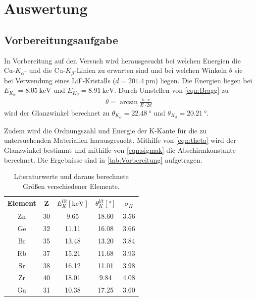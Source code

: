 \section{Auswertung}
\label{sec:Auswertung}

\subsection{Vorbereitungsaufgabe} %
\label{sub:Vorbereitung}

In Vorbereitung auf den Versuch wird herausgesucht bei welchen Energien die Cu-$K_\alpha$- und die Cu-$K_\beta$-Linien
zu erwarten sind und bei welchen Winkeln $\theta$ sie bei Verwendung eines LiF-Kristalls ($d = \qty{201.4}{\pico\meter}$) liegen.
Die Energien liegen bei $E_{K_\alpha}= \qty{8.05}{\kilo\electronvolt}$ und $E_{K_\beta}= \qty{8.91}{\kilo\electronvolt}$\cite{X-Ray}.
Durch Umstellen von \autoref{eqn:Bragg} zu
\begin{align}
  \theta = \arcsin{\frac{h \cdot c} {E \cdot 2 d}} \label{eqn:theta}
\end{align}
wird der Glanzwinkel berechnet zu $\theta_{K_\alpha}= \qty{22.48}{\degree}$ und $\theta_{K_\beta}= \qty{20.21}{\degree}$.

Zudem wird die Ordnungszahl und Energie der K-Kante für die zu untersuchenden Materialien harausgesucht. Mithilfe von
\autoref{eqn:theta} wird der Glanzwinkel bestimmt und mithilfe von \autoref{eqn:sigmak} die Abschirmkonstante berechnet.
Die Ergebnisse sind in \autoref{tab:Vorbereitung} aufgetragen.

\begin{table}[H]
  \centering
  \caption{Literaturwerte und daraus berechnete Größen verschiedener Elemente.\cite{X-Ray}}
  \label{tab:Vorbereitung}
  \begin{tabular}{c S[table-format=2.0] S S S[table-format=1.2] }
  \toprule
  {Element} & {Z} & {$E_{K}^{lit} [\si{\kilo\electronvolt}]$}& {$\theta_{K}^{lit} [\si{\degree}]$} & {$\sigma_K$}\\
  \midrule
    Zn & 30 &  9.65 & 18.60 & 3.56 \\
    Ge & 32 & 11.11 & 16.08 & 3.66 \\
    Br & 35 & 13.48 & 13.20 & 3.84 \\
    Rb & 37 & 15.21 & 11.68 & 3.93 \\
    Sr & 38 & 16.12 & 11.01 & 3.98 \\
    Zr & 40 & 18.01 &  9.84 & 4.08 \\
    Ga & 31 & 10.38 & 17.25 & 3.60 \\ 
  \bottomrule
  \end{tabular}
\end{table}

